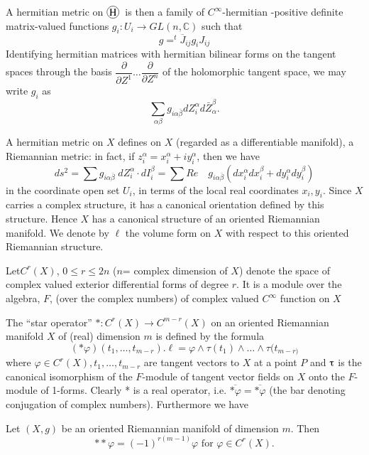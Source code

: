A hermitian metric on $\mycirc{H}$ is then a family of $
C^\infty$-hermitian -positive definite matrix-valued functions $g_i :
U_i \rightarrow GL (n, \mathbb{C})$ such that  
$$
g=^t\overline J_{ij} g_i J_{ij}
$$
Identifying hermitian matrices with hermitian bilinear forms on the
tangent spaces through the basis $\dfrac{\partial}{\partial Z^1} \ldots
\dfrac{\partial}{\partial Z^n}$ of the holomorphic tangent space, we
may write $g_i$ as 
$$
\sum\limits_{\alpha \beta } g_{i  \alpha \bar{\beta}}
dZ_i^\alpha  d \bar{Z}^\beta_\alpha.
$$

A hermitian metric on $X$ defines on $X$ (regarded as a differentiable
manifold), a Riemannian metric: in fact, if $z^\alpha_i =x^\alpha_i
+iy^\alpha_i$, then we have  
$$
ds^2 =\sum g_{i \alpha \overline\beta} \; dZ^\alpha_i \cdot dI^\beta_i
= \sum Re \quad g_{i \alpha \overline \beta}(dx^\alpha_i
dx^\beta_i + dy^\alpha_i dy^\beta_i)
$$ 
in the coordinate open set $U_i$, in terms of the local real
coordinates $x_i,y_i$. Since $X$ carries a complex structure, it
has a canonical orientation defined by this structure. Hence $X$ has a
canonical structure of an oriented Riemannian manifold. We denote by
$\ell$ the volume form on $X$ with respect to this oriented Riemannian
structure. 

Let\pageoriginale $C^r(X)$, $0\leq r \leq 2n$ ($n$= complex dimension of
$X$)  denote the 
space of complex valued exterior differential forms of degree $r$.
It is a module over the algebra, $F$, (over the complex
numbers) of complex valued $C^\infty$ function on $X$ 

\begin{definition}%
  The ``star operator'' $* :C^r(X)
  \rightarrow C^{m-r}(X)$  on an oriented Riemannian manifold $X$ of (real)
  dimension  $m$ is defined by the formula  
$$
(* \varphi)(t_1,\ldots , t_{m-r}) . \ell=\varphi\wedge \tau (t_1)\wedge
  \ldots \wedge \tau (t_{m-r)}
$$ 
where $\varphi \in C^r (X), t_1,\dots ,t_{m-r}$  are tangent vectors
  to $X$ at a point $P$ and $\tauup$ is the canonical isomorphism of the
  $F$-module of tangent vector fields on $X$ onto the $F$-module of
  1-forms. Clearly * is a real operator,
  i.e. $\overline{*\varphi}=\overline{* \varphi }$ (the bar denoting
  conjugation of complex numbers). Furthermore we have 
\end{definition}

\begin{lemma}%
  Let $(X, g)$ be an oriented Riemannian
  manifold of dimension $m$. Then 
  \begin{equation}
    **\varphi =(-1)^{r(m-1)}\varphi  \text{ for } \varphi \in  C^r
    (X).    \tag{1 \; I} 
  \end{equation}
\end{lemma}

